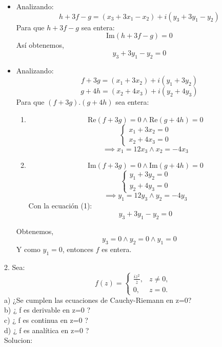 \documentclass[a4paper,12pt]{article}
\begin{document}
\begin{itemize}
    \item Analizando:
    \[
    h + 3f - g = (x_3 + 3x_1 - x_2) + i(y_3 + 3y_1 - y_2)
    \]
    Para que $h + 3f - g$ sea entera:
    \[
    \text{Im}(h + 3f - g) = 0
    \]
    Así obtenemos,
    \[
    y_3 + 3y_1 - y_2 = 0 \tag{1}
    \]

    \item Analizando:
    \[
    f + 3g = (x_1 + 3x_2) + i(y_1 + 3y_2)
    \]
    \[
    g + 4h = (x_2 + 4x_3) + i(y_2 + 4y_3)
    \]
    Para que $(f + 3g).(g + 4h)$ sea entera:
    \begin{enumerate}[label=\roman*)]
        \item 
        \[
        \text{Re}(f + 3g) = 0 \land \text{Re}(g + 4h) = 0
        \]
        \[
        \begin{cases}
        x_1 + 3x_2 = 0 \\
        x_2 + 4x_3 = 0
        \end{cases}
        \]
        \[
        \implies x_1 = 12x_3 \land x_2 = -4x_3
        \]

        \item 
        \[
        \text{Im}(f + 3g) = 0 \land \text{Im}(g + 4h) = 0
        \]
        \[
        \begin{cases}
        y_1 + 3y_2 = 0 \\
        y_2 + 4y_3 = 0
        \end{cases}
        \]
        \[
        \implies y_1 = 12y_3 \land y_2 = -4y_3
        \]
        Con la ecuación (1):
        \[
        y_3 + 3y_1 - y_2 = 0
        \]

    \end{enumerate}
    Obtenemos,
    \[
    y_3 = 0 \land y_2 = 0 \land y_1 = 0
    \]
    Y como $y_1 = 0$, entonces $f$ es entera.
\end{itemize}
2. Sea:\\ 
\[
f(z) =
\begin{cases}
\frac{iz^2}{\overline{z}}, & z \neq 0, \\
0, & z = 0.
\end{cases}
\]
a)	¿Se cumplen las ecuaciones de Cauchy-Riemann en z=0?\\   
b)	¿ f es derivable en z=0 ?\\                                
c)	¿ f es continua en z=0 ?\\     
d)	 ¿ f  es analítica en z=0 ?\\                                               
Solucion:
\end{document}
